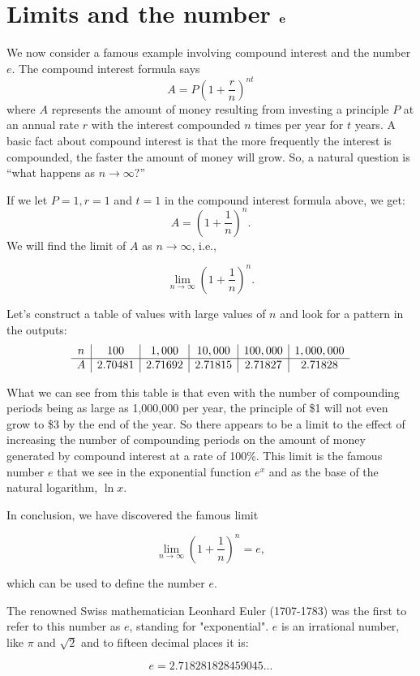 \documentclass{ximera}
\begin{document}
\section{Limits and the number ${\bf e}$}


We now consider a famous example involving compound interest and the number $e$.
The compound interest formula says 
\[ A = P\left(1+\frac{r}{n}\right)^{nt} \]
where $A$ represents the amount of money resulting from investing a principle $P$ at an annual rate $r$ with 
the interest compounded $n$ times per year for $t$ years.  A basic fact about compound interest is that the more frequently 
the interest is compounded, the faster the amount of money will grow. 
So, a natural question is ``what happens as $n \to \infty?$''



\begin{example}[example 7]
If we let $P=1, r= 1$ and $t=1$ in the compound interest formula above, we get:
\[
A = \left(1 + \frac{1}{n}\right)^n.
\]
 We will find the limit of $A$ as $n \to \infty$, i.e., 

\[
\lim_{n \to \infty} \left(1+\frac{1}{n}\right)^n.
\]

Let's construct a table of values with large values of $n$ and look for a pattern in the outputs:
\[
\begin{array}{ c | c | c | c | c|c}
  n & 100 & 1,000 & 10,000 & 100,000 & 1,000,000\\ 
	\hline
	A & 2.70481 & 2.71692 & 2.71815 & 2.71827 & 2.71828
	\end{array}
\] 

What we can see from this table is that even with the number of compounding periods being as large as 1,000,000 per year, 
the principle of \$1 will not even grow to \$3 by the end of the year.  So there appears to be a limit to the effect of increasing the 
number of compounding periods on the amount of money generated by compound interest at a rate of 100\%. 
This limit is the famous number $e$ that we see in the exponential function $e^x$ and as the base of the natural logarithm, $\ln x$.

In conclusion, we have discovered the famous limit

\[\lim_{n \to \infty} \left(1+\frac{1}{n}\right)^n = e,\]

which can be used to define the number $e$.

The renowned Swiss mathematician Leonhard Euler (1707-1783) was the first to refer to this number as $e$,
standing for "exponential".  $e$ is an irrational number, like $\pi$ and $\sqrt 2$ and to fifteen decimal places it is:

\[ e = 2.718281828459045... \]

\end{example}
\end{document}
